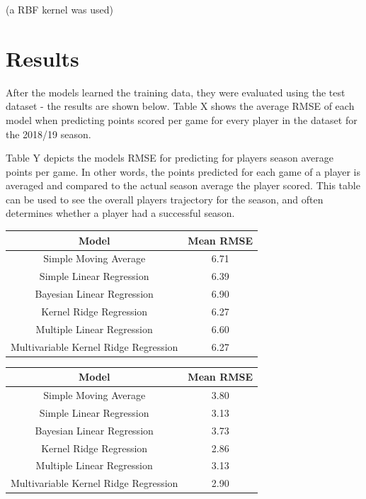 \documentclass[a4paper,11pt,twoside]{article}
\begin{document}
(a RBF kernel was used)
\newpage

\section{Results}

After the models learned the training data, they were evaluated using the test dataset - the results are shown below. Table X shows the average RMSE of each model when predicting points scored per game for every player in the dataset for the 2018/19 season.

Table Y depicts the models RMSE for predicting for players season average points per game. In other words, the points predicted for each game of a player is averaged and compared to the actual season average the player scored. This table can be used to see the overall players trajectory for the season, and often determines whether a player had a successful season.
\vspace{5mm}
\begin{center}
\begin{tabular}{ |c|c|} 
 \hline
 \textbf{Model} & \textbf{Mean RMSE}\\ 
 \hline
 Simple Moving Average &  6.71\\ 
 \hline
 Simple Linear Regression &  6.39\\ 
 \hline
 Bayesian Linear Regression& 6.90\\
 \hline
 Kernel Ridge Regression& 6.27\\
 \hline
 Multiple Linear Regression& 6.60\\
 \hline
 Multivariable Kernel Ridge Regression & 6.27\\
 \hline
\end{tabular}
\end{center}
\vspace{5mm}

\vspace{5mm}
\begin{center}
\begin{tabular}{ |c|c|} 
 \hline
     \textbf{Model} & \textbf{Mean RMSE}\\ 
 \hline
 Simple Moving Average  & 3.80\\ 
 \hline
 Simple Linear Regression & 3.13\\ 
 \hline
 Bayesian Linear Regression  & 3.73 \\
 \hline
 Kernel Ridge Regression  & 2.86\\
 \hline
 Multiple Linear Regression& 3.13\\
 \hline
 Multivariable Kernel Ridge Regression  & 2.90\\
 \hline
\end{tabular}
\end{center}
\vspace{5mm}
\end{document}
